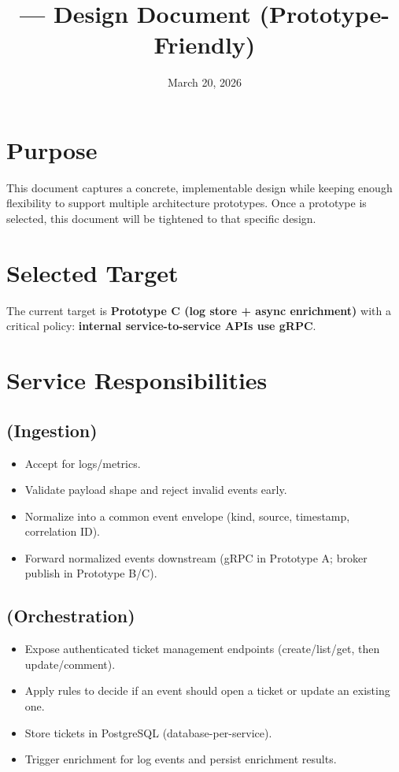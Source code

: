 \documentclass[11pt]{article}
\title{\watchdog{} --- Design Document (Prototype-Friendly)}
\author{}
\date{March 20, 2026}
\begin{document}
\maketitle

\section{Purpose}
This document captures a concrete, implementable design while keeping enough flexibility to support multiple architecture prototypes.
Once a prototype is selected, this document will be tightened to that specific design.

\section{Selected Target}
The current target is \textbf{Prototype C (log store + async enrichment)} with a critical policy:
\textbf{internal service-to-service APIs use gRPC}.

\section{Service Responsibilities}

\subsection{ (Ingestion)}
\begin{itemize}
  \item Accept  for logs/metrics.
  \item Validate payload shape and reject invalid events early.
  \item Normalize into a common event envelope (kind, source, timestamp, correlation ID).
  \item Forward normalized events downstream (gRPC in Prototype A; broker publish in Prototype B/C).
\end{itemize}

\subsection{ (Orchestration)}
\begin{itemize}
  \item Expose authenticated ticket management endpoints (create/list/get, then update/comment).
  \item Apply rules to decide if an event should open a ticket or update an existing one.
  \item Store tickets in PostgreSQL (database-per-service).
  \item Trigger enrichment for log events and persist enrichment results.
\end{itemize}
\end{document}
